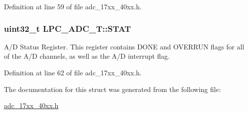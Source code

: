 Definition at line 59 of file adc\+\_\+17xx\+\_\+40xx.\+h.

\subsubsection[{\texorpdfstring{S\+T\+AT}{STAT}}]{ uint32\+\_\+t L\+P\+C\+\_\+\+A\+D\+C\+\_\+\+T\+::\+S\+T\+AT}\hypertarget{structLPC__ADC__T_a6fd64c9a5717b2adc106721eb9ab190b}{}\label{structLPC__ADC__T_a6fd64c9a5717b2adc106721eb9ab190b}
A/D Status Register. This register contains D\+O\+NE and O\+V\+E\+R\+R\+UN flags for all of the A/D channels, as well as the A/D interrupt flag. 

Definition at line 62 of file adc\+\_\+17xx\+\_\+40xx.\+h.



The documentation for this struct was generated from the following file\+:\begin{DoxyCompactItemize}
\item 
\hyperlink{adc__17xx__40xx_8h}{adc\+\_\+17xx\+\_\+40xx.\+h}\end{DoxyCompactItemize}
